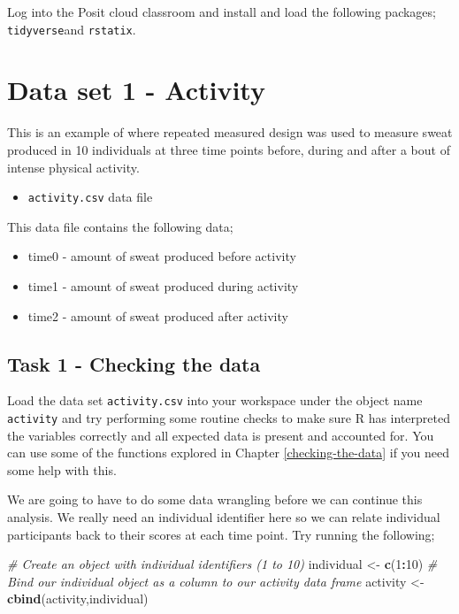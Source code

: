 \documentclass[
]{book}
\newenvironment{Shaded}{\begin{snugshade}}{\end{snugshade}}
\newcommand{\CommentTok}[1]{\textcolor[rgb]{0.56,0.35,0.01}{\textit{#1}}}
\newcommand{\DecValTok}[1]{\textcolor[rgb]{0.00,0.00,0.81}{#1}}
\newcommand{\FunctionTok}[1]{\textcolor[rgb]{0.13,0.29,0.53}{\textbf{#1}}}
\newcommand{\NormalTok}[1]{#1}
\newcommand{\OtherTok}[1]{\textcolor[rgb]{0.56,0.35,0.01}{#1}}
\newcommand{\SpecialCharTok}[1]{\textcolor[rgb]{0.81,0.36,0.00}{\textbf{#1}}}
\providecommand{\tightlist}{%
  \setlength{\itemsep}{0pt}\setlength{\parskip}{0pt}}
\begin{document}
Log into the Posit cloud classroom and install and load the following packages; \texttt{tidyverse}and \texttt{rstatix}.

\hypertarget{data-set-1---activity}{%
\section{Data set 1 - Activity}\label{data-set-1---activity}}

This is an example of where repeated measured design was used to measure sweat produced in 10 individuals at three time points before, during and after a bout of intense physical activity.

\begin{itemize}
\tightlist
\item
  \texttt{activity.csv} data file
\end{itemize}

This data file contains the following data;

\begin{itemize}
\tightlist
\item
  time0 - amount of sweat produced before activity
\item
  time1 - amount of sweat produced during activity
\item
  time2 - amount of sweat produced after activity
\end{itemize}

\hypertarget{task-1---checking-the-data-3}{%
\subsection{Task 1 - Checking the data}\label{task-1---checking-the-data-3}}

Load the data set \texttt{activity.csv} into your workspace under the object name \texttt{activity} and try performing some routine checks to make sure R has interpreted the variables correctly and all expected data is present and accounted for. You can use some of the functions explored in Chapter \ref{checking-the-data} if you need some help with this.

We are going to have to do some data wrangling before we can continue this analysis. We really need an individual identifier here so we can relate individual participants back to their scores at each time point. Try running the following;

\begin{Shaded}
\begin{Highlighting}[]
\CommentTok{\# Create an object with individual identifiers (1 to 10)}
\NormalTok{individual }\OtherTok{\textless{}{-}} \FunctionTok{c}\NormalTok{(}\DecValTok{1}\SpecialCharTok{:}\DecValTok{10}\NormalTok{)}
\CommentTok{\# Bind our \textasciigrave{}individual\textasciigrave{} object as a column to our \textasciigrave{}activity\textasciigrave{} data frame}
\NormalTok{activity }\OtherTok{\textless{}{-}} \FunctionTok{cbind}\NormalTok{(activity,individual)}
\end{Highlighting}
\end{Shaded}
\end{document}
